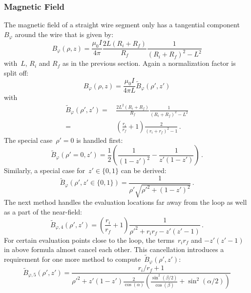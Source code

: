 \subsubsection{Magnetic Field}
The magnetic field of a straight wire segment
only has a tangential component~$B_\varphi$ around the wire that is given by:
\begin{equation}
  B_\varphi(\rho, z) = \frac{\mu_0 I}{4 \pi} \frac{2 L (R_i + R_f)}{R_f} \frac{1}{\left(R_i + R_f\right)^2 - L^2}
\end{equation}
with~$L$, $R_i$ and $R_f$ as in the previous section.
Again a normalization factor is split off:
\begin{equation}
  B_\varphi(\rho, z) = \frac{\mu_0 I}{4 \pi L} \tilde{B}_\varphi(\rho', z')
\end{equation}
with
\begin{align}
  \tilde{B}_\varphi(\rho', z')
  =&\, \frac{2 L^2(R_i + R_f)}{R_f} \frac{1}{\left(R_i + R_f\right)^2 - L^2} \nonumber \\
  =&\, \left(\frac{r_i}{r_f} + 1\right) \frac{2}{\left(r_i + r_f\right)^2 - 1} \, .
\end{align}
The special case~$\rho'=0$ is handled first:
\begin{equation}
  \tilde{B}_\varphi(\rho'=0, z') = \frac{1}{2} \left( \frac{1}{(1-z')^2} - \frac{1}{z'(1-z')} \right) \, .
\end{equation}
Similarly, a special case for~$z' \in \{0, 1\}$ can be derived:
\begin{equation}
  \tilde{B}_\varphi(\rho', z' \in \{0, 1\}) = \frac{1}{\rho' \sqrt{{\rho'}^2 + (1-z')^2}} \, .
\end{equation}
The next method handles the evaluation locations far away from the loop
as well as a part of the near-field:
\begin{equation}
  \tilde{B}_{\varphi,4} (\rho', z')
  = \left(\frac{r_i}{r_f} + 1\right) \frac{1}{{\rho'}^2 + r_i r_f - z' (z' - 1)} \, .
\end{equation}
For certain evaluation points close to the loop,
the terms~$r_i r_f$ and $-z' (z' - 1)$ in above formula almost cancel each other.
This cancellation introduces a requirement for one more method to compute~$\tilde{B}_\varphi (\rho', z')$:
\begin{equation}
  \tilde{B}_{\varphi, 5} (\rho', z')
  = \frac{r_i / r_f + 1}
         {{\rho'}^2 + z' (1 - z') \frac{2}{\cos(\alpha)} \left( \frac{\sin^2(\beta/2)}{\cos(\beta)} + \sin^2(\alpha/2) \right)}
\end{equation}
